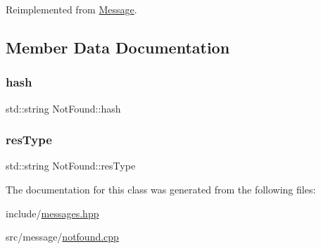 Reimplemented from \mbox{\hyperlink{classMessage_a6f8e3ac2eed3a8afe9400fcd5b3447b2}{Message}}.



\subsection{Member Data Documentation}
\mbox{\label{classNotFound_ace964753b12aac33c1f05bbdb6bf813b}} 
\subsubsection{\texorpdfstring{hash}{hash}}
{\footnotesize\ttfamily std\+::string Not\+Found\+::hash\hspace{0.3cm}{\ttfamily [private]}}

\mbox{\label{classNotFound_acd2ac9fcbc773b0acbe204fbc100316b}} 
\subsubsection{\texorpdfstring{res\+Type}{resType}}
{\footnotesize\ttfamily std\+::string Not\+Found\+::res\+Type\hspace{0.3cm}{\ttfamily [private]}}



The documentation for this class was generated from the following files\+:\begin{DoxyCompactItemize}
\item 
include/\mbox{\hyperlink{messages_8hpp}{messages.\+hpp}}\item 
src/message/\mbox{\hyperlink{notfound_8cpp}{notfound.\+cpp}}\end{DoxyCompactItemize}
